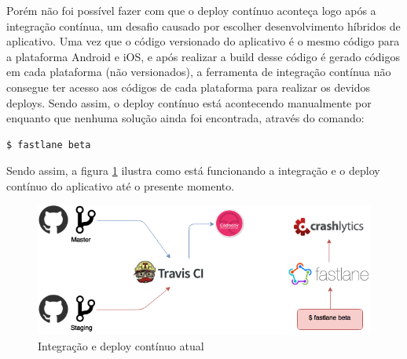 Porém não foi possível fazer com que o deploy contínuo aconteça logo após a integração contínua, um desafio causado por escolher desenvolvimento híbridos de aplicativo.
Uma vez que o código versionado do aplicativo é o mesmo código para a plataforma Android e iOS, e após realizar a build desse código é gerado códigos em cada plataforma (não versionados),
a ferramenta de integração contínua não consegue ter acesso aos códigos de cada plataforma para realizar os devidos deploys. Sendo assim, o deploy contínuo está acontecendo manualmente
por enquanto que nenhuma solução ainda foi encontrada, através do comando:

\begin{lstlisting}[language=bash]
  $ fastlane beta
\end{lstlisting}

Sendo assim, a figura \ref{img:integracao_deploy_continuo_atual} ilustra como está funcionando a integração e o deploy contínuo do aplicativo até o presente momento.

\begin{figure}[H]
    \centering
    \includegraphics[scale=0.5]{figuras/ci_currently.png}
    \caption[Integração e deploy contínuo atual]{Integração e deploy contínuo atual}
    \label{img:integracao_deploy_continuo_atual}
\end{figure}

